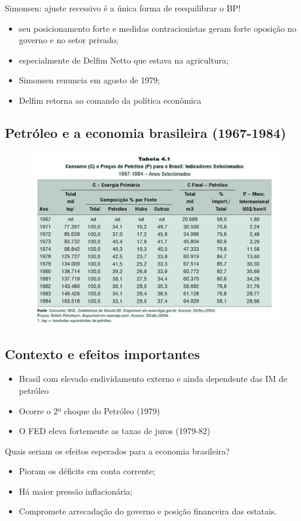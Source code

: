 \documentclass[a4paper,12pt]{article}[abntex2]
\begin{document}
Simonsen: ajuste recessivo é a única forma de reequilibrar o BP!\begin{itemize}
    \item seu posicionamento forte e medidas contracionistas geram forte oposição no governo e no setor privado;
    \item especialmente de Delfim Netto que estava na agricultura;
    \item Simonsen renuncia em agosto de 1979;
    \item Delfim retorna ao comando da política econômica
\end{itemize}

\subsection{\textbf{Petróleo e a economia brasileira (1967-1984)}}
\begin{figure}[H]
    \centering
    \includegraphics[width=0.7\linewidth]{Imagens/a8i1.png}
\end{figure}

\subsection{\textbf{Contexto e efeitos importantes}}

\begin{itemize}
    \item Brasil com elevado endividamento externo e ainda dependente das IM de petróleo
    \item Ocorre o 2º choque do Petróleo (1979)
    \item O FED eleva fortemente as taxas de juros (1979-82)
\end{itemize}

Quais seriam os efeitos esperados para a economia brasileira?\begin{itemize}
    \item Pioram os déficits em conta corrente;
    \item Há maior pressão inflacionária;
    \item Compromete arrecadação do governo e posição financeira das estatais.
\end{itemize}
\end{document}
